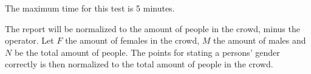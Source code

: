 The maximum time for this test is 5 minutes.

The report will be normalized to the amount of people in the crowd, minus the operator. 
Let $F$ the amount of females in the crowd, $M$ the amount of males and $N$ be the total amount of people. 
The points for stating a persons' gender correctly is then normalized to the total amount of people in the crowd. 

\begin{scorelist}
\end{scorelist}


